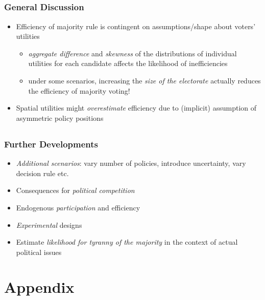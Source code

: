 \documentclass{beamer}
\begin{document}
\subsection{}
\begin{frame}%
  \frametitle{General Discussion}
  \begin{itemize}
    \item Efficiency of majority rule is contingent on assumptions/shape about voters' utilities
    \begin{itemize}
      \item \emph{aggregate difference} and \emph{skewness} of the distributions of individual utilities for each candidate affects the likelihood of inefficiencies
      \item under some scenarios, increasing the \emph{size of the electorate} actually reduces the efficiency of majority voting!
    \end{itemize}
    \item Spatial utilities might \emph{overestimate} efficiency due to (implicit) assumption of asymmetric policy positions

  \end{itemize}
\end{frame}

\subsection{}
\begin{frame}
  \frametitle{Further Developments}
    \begin{itemize}
      \item \emph{Additional scenarios}: vary number of policies, introduce uncertainty, vary decision rule etc.
      \item Consequences for \emph{political competition}
      \item Endogenous \emph{participation} and efficiency
      \item \emph{Experimental} designs
      \item Estimate \emph{likelihood for tyranny of the majority} in the context of actual political issues
    \end{itemize}
\end{frame}

\section{Appendix}
\end{document}

